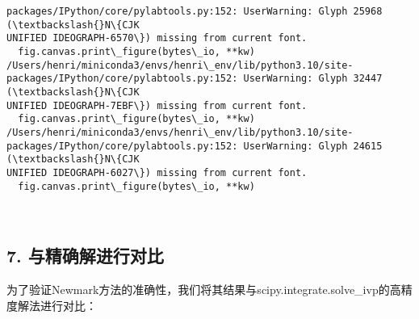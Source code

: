 \documentclass[11pt]{article}
\begin{document}
\begin{Verbatim}[commandchars=\\\{\}]
packages/IPython/core/pylabtools.py:152: UserWarning: Glyph 25968 (\textbackslash{}N\{CJK
UNIFIED IDEOGRAPH-6570\}) missing from current font.
  fig.canvas.print\_figure(bytes\_io, **kw)
/Users/henri/miniconda3/envs/henri\_env/lib/python3.10/site-
packages/IPython/core/pylabtools.py:152: UserWarning: Glyph 32447 (\textbackslash{}N\{CJK
UNIFIED IDEOGRAPH-7EBF\}) missing from current font.
  fig.canvas.print\_figure(bytes\_io, **kw)
/Users/henri/miniconda3/envs/henri\_env/lib/python3.10/site-
packages/IPython/core/pylabtools.py:152: UserWarning: Glyph 24615 (\textbackslash{}N\{CJK
UNIFIED IDEOGRAPH-6027\}) missing from current font.
  fig.canvas.print\_figure(bytes\_io, **kw)
    \end{Verbatim}

    \begin{center}
    \end{center}
    { \hspace*{\fill} \\}
    
    \subsection{7.
与精确解进行对比}\label{ux4e0eux7cbeux786eux89e3ux8fdbux884cux5bf9ux6bd4}

为了验证Newmark方法的准确性，我们将其结果与scipy.integrate.solve\_ivp的高精度解法进行对比：
\end{document}
